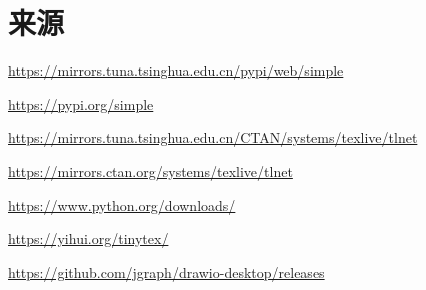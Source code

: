 \documentclass[UTF8,a4paper,10pt]{ctexart}
\begin{document}
\section*{来源}
\noindent\url{https://mirrors.tuna.tsinghua.edu.cn/pypi/web/simple}\par
\noindent\url{https://pypi.org/simple}\par
\noindent\url{https://mirrors.tuna.tsinghua.edu.cn/CTAN/systems/texlive/tlnet}\par
\noindent\url{https://mirrors.ctan.org/systems/texlive/tlnet}\par
\noindent\url{https://www.python.org/downloads/}\par
\noindent\url{https://yihui.org/tinytex/}\par
\noindent\url{https://github.com/jgraph/drawio-desktop/releases}\par
\end{document}

